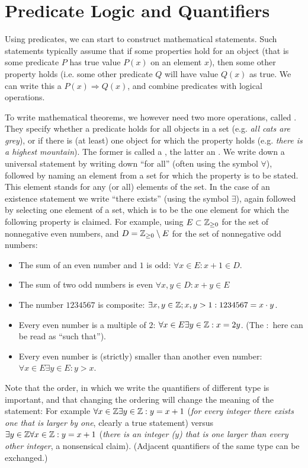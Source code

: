 \section{Predicate Logic and Quantifiers}

Using predicates, we can start to construct mathematical statements. Such
statements typically assume that if some properties hold for an object (that
is some predicate $P$ has true value $P(x)$ on an element $x$), then some
other property holds (i.e. some other predicate $Q$ will have value $Q(x)$
as true. We can write this a $P(x)\Rightarrow Q(x)$, and combine predicates
with logical operations.

To write mathematical theorems, we however need two more operations, called
. They specify whether a predicate holds for all objects
in a set (e.g. {\em all cats are grey}), or if there is (at least) one
object for which the property holds (e.g. {\em there is a highest
mountain}). The former is called a , the latter
an .
We write down a universal statement
by writing down ``for all'' (often using the symbol $\forall$), followed by
naming an element from a set for which the property is to be stated. This
element stands for any (or all) elements of the set.
In the case of an existence statement we write ``there exists'' (using the
symbol $\exists$), again followed by selecting one element of a set, which
is to be the one element for which the following property is claimed.
For example,
using $E\subset{\mathbb Z}_{\ge 0}$ for the set of nonnegative even numbers, and
$D={\mathbb Z}_{\ge 0}\setminus E$ for the
set of nonnegative odd numbers:
\begin{itemize}
\item The sum of an even number and $1$ is odd:
$\forall x\in E: x+1\in D$.
\item The sum of two odd numbers is even
$\forall x,y\in D:x+y\in E$
\item
The number $1234567$ is composite: $\exists x,y\in{\mathbb Z}; x,y>1: 1234567=x\cdot
y$.
\item
Every even number is a multiple of $2$: $\forall x\in E\exists y\in{\mathbb Z}:
x=2y$. (The $:$ here can be read as ``such that'').
\item
Every even number is (strictly) smaller than another even number:
$\forall x\in E\exists y\in E:y>x$.
\end{itemize}

Note that the order, in which we write the quantifiers of different type is important, and
that changing the ordering will change the meaning of the statement: For
example $\forall x\in{\mathbb Z}\exists y\in {\mathbb Z}: y=x+1$ ({\em for every integer there
exists one that is larger by one}, clearly a true statement) versus $\exists
y\in {\mathbb Z}\forall x\in{\mathbb Z}: y=x+1$ ({\em there is an integer ($y$) that is one
larger than every other integer}, a nonsensical claim).
(Adjacent quantifiers of the same type can be exchanged.)
\medskip

